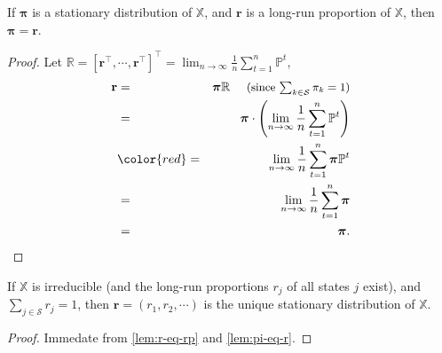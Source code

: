 \begin{lemma} \label{lem:pi-eq-r}
If $ \boldsymbol\pi $ is a stationary distribution of $ \mathbb{X} $, and $ \mathbf{r} $ is a long-run proportion of $ \mathbb{X} $, then $ \boldsymbol\pi = \mathbf{r} $.

\begin{proof}
Let $ \mathbb{R} = [\mathbf{r}^{\intercal}, \cdots, \mathbf{r}^{\intercal}]^{\intercal} = \lim_{n \to \infty} \frac{1}{n} \sum_{t = 1}^{n} \mathbb{P}^{t} $,
\begin{eqnarray*}
\mathbf{r}
  & = & \boldsymbol\pi \mathbb{R}
    \text{ \hspace{1em}\small(since $ \textstyle\sum_{k \in \mathcal{S}} \pi_{k} = 1 $)} \\
  & = & \boldsymbol\pi \cdot \left( \lim_{n \to \infty} \frac{1}{n} \sum_{t = 1}^{n} \mathbb{P}^{t} \right) \\
  & {\color{red} =} & \lim_{n \to \infty} \frac{1}{n} \sum_{t = 1}^{n} \boldsymbol\pi \mathbb{P}^{t} \\
  & = & \lim_{n \to \infty} \frac{1}{n} \sum_{t = 1}^{n} \boldsymbol\pi \\
  & = & \boldsymbol\pi.
\end{eqnarray*}
\end{proof}

\begin{comment}
\begin{eqnarray*}
(\boldsymbol\pi \mathbb{R})[i, j]
  & = & \sum_{k \in \mathcal{S}} \pi_{k} \cdot r_{j} \\
  & = & r_{j} \sum_{k \in \mathcal{S}} \pi_{k} \\
  & = & \lim_{n \to \infty} \frac{1}{n} \sum_{t = 1}^{n} \mathbb{P}^{t}[i, j] \cdot \sum_{k \in \mathcal{S}} \pi_{k} \\
  & = & \lim_{n \to \infty} \frac{1}{n} \sum_{t = 1}^{n} \sum_{k \in \mathcal{S}} \pi_{k} \cdot \mathbb{P}^{t}[k, j] \\
  & = & \lim_{n \to \infty} \frac{1}{n} \sum_{t = 1}^{n} \boldsymbol\pi \mathbb{P}^{t}[i, j] \\
\end{eqnarray*}
\end{comment}
\end{lemma}

\begin{theorem}
If $ \mathbb{X} $ is irreducible (and the long-run proportions $ r_{j} $ of all states $ j $ exist), and $ \sum_{j \in \mathcal{S}} r_{j} = 1 $, then $ \mathbf{r} = (r_{1}, r_{2}, \cdots) $ is the unique stationary distribution of $ \mathbb{X} $.

\begin{proof}
Immedate from \autoref{lem:r-eq-rp} and \autoref{lem:pi-eq-r}.
\end{proof}
\end{theorem}

